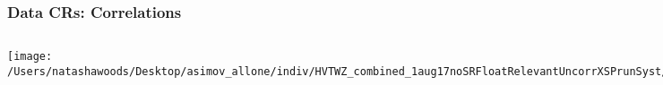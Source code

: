 \documentclass{beamer}
\begin{document}
\begin{frame}
\frametitle{Data CRs: Correlations}
    \begin{columns}[t]

              \texttt{[image: /Users/natashawoods/Desktop/asimov\_allone/indiv/HVTWZ\_combined\_1aug17noSRFloatRelevantUncorrXSPrunSyst/corr\_doAsimov0\_doCondtional1\_mu0\_HighCorr.pdf]}
       

              \texttt{[image: /Users/natashawoods/Desktop/asimov\_allone/indiv/HVTWZ\_combined\_1aug17noSRFloatRelevantUncorrXSSingleBinPrunSyst/corr\_doAsimov0\_doCondtional1\_mu0\_HighCorr.pdf]}
\end{columns}
\end{frame}
\end{document}
